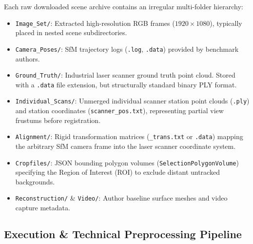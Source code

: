 \vspace{0.2cm}
\noindent Each raw downloaded scene archive contains an irregular multi-folder hierarchy:
\begin{itemize}
    \item \texttt{Image\_Set/}: Extracted high-resolution RGB frames ($1920\times1080$), typically placed in nested scene subdirectories.
    \item \texttt{Camera\_Poses/}: SfM trajectory logs (\texttt{.log}, \texttt{.data}) provided by benchmark authors.
    \item \texttt{Ground\_Truth/}: Industrial laser scanner ground truth point cloud. Stored with a \texttt{.data} file extension, but structurally standard binary PLY format.
    \item \texttt{Individual\_Scans/}: Unmerged individual scanner station point clouds (\texttt{.ply}) and station coordinates (\texttt{scanner\_pos.txt}), representing partial view frustums before registration.
    \item \texttt{Alignment/}: Rigid transformation matrices (\texttt{\_trans.txt} or \texttt{.data}) mapping the arbitrary SfM camera frame into the laser scanner coordinate system.
    \item \texttt{Cropfiles/}: JSON bounding polygon volumes (\texttt{SelectionPolygonVolume}) specifying the Region of Interest (ROI) to exclude distant untracked backgrounds.
    \item \texttt{Reconstruction/} \& \texttt{Video/}: Author baseline surface meshes and video capture metadata.
\end{itemize}

\subsection{Execution \& Technical Preprocessing Pipeline}

